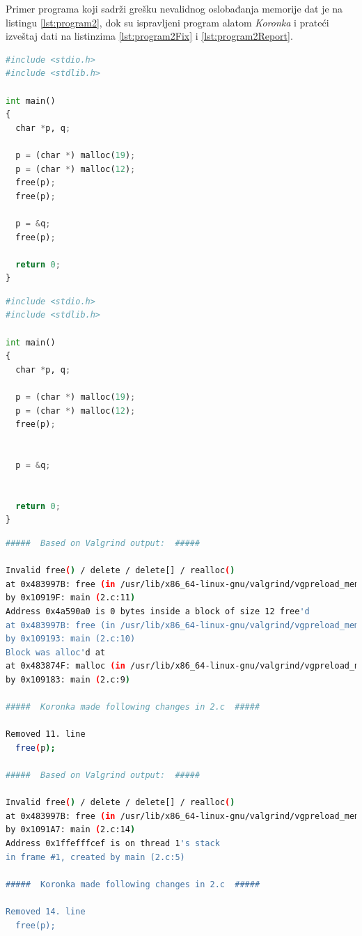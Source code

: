 \documentclass[12pt,oneside]{memoir}
\theoremstyle{plain}
\theoremstyle{definition}
\begin{document}
Primer programa koji sadrži grešku nevalidnog oslobađanja memorije dat je na listingu \ref{lst:program2}, dok su ispravljeni program alatom \textit{Koronka} i prateći izveštaj dati na listinzima \ref{lst:program2Fix} i \ref{lst:program2Report}.

\begin{lstlisting}[style=mystyle,caption={Program koji sadrži grešku nevalidnog oslobađanja memorije}, label={lst:program2},language={Python}] 
#include <stdio.h>
#include <stdlib.h>

int main()
{
  char *p, q;

  p = (char *) malloc(19);
  p = (char *) malloc(12);
  free(p);
  free(p);

  p = &q;
  free(p); 			
  				
  return 0;
}
\end{lstlisting}

\begin{lstlisting}[style=mystyle,caption={Predlog rešenja alata \textit{Koronka} za greške otkrivene u programu sa listinga \ref{lst:program2}}, label={lst:program2Fix},language={Python}] 
#include <stdio.h>
#include <stdlib.h>

int main()
{
  char *p, q;

  p = (char *) malloc(19);
  p = (char *) malloc(12);
  free(p);


  p = &q;

  				
  return 0;
}
\end{lstlisting}

\begin{lstlisting}[style=terminal,caption={Izveštaj o radu alata \textit{Koronka} za program sa listinga \ref{lst:program2}}, label={lst:program2Report},language={bash}]   
#####  Based on Valgrind output:  #####

Invalid free() / delete / delete[] / realloc()
at 0x483997B: free (in /usr/lib/x86_64-linux-gnu/valgrind/vgpreload_memcheck-amd64-linux.so)
by 0x10919F: main (2.c:11)
Address 0x4a590a0 is 0 bytes inside a block of size 12 free'd
at 0x483997B: free (in /usr/lib/x86_64-linux-gnu/valgrind/vgpreload_memcheck-amd64-linux.so)
by 0x109193: main (2.c:10)
Block was alloc'd at
at 0x483874F: malloc (in /usr/lib/x86_64-linux-gnu/valgrind/vgpreload_memcheck-amd64-linux.so)
by 0x109183: main (2.c:9)

#####  Koronka made following changes in 2.c  #####

Removed 11. line
  free(p);

#####  Based on Valgrind output:  #####

Invalid free() / delete / delete[] / realloc()
at 0x483997B: free (in /usr/lib/x86_64-linux-gnu/valgrind/vgpreload_memcheck-amd64-linux.so)
by 0x1091A7: main (2.c:14)
Address 0x1ffefffcef is on thread 1's stack
in frame #1, created by main (2.c:5)

#####  Koronka made following changes in 2.c  #####

Removed 14. line
  free(p); 			
\end{lstlisting}
\end{document}
